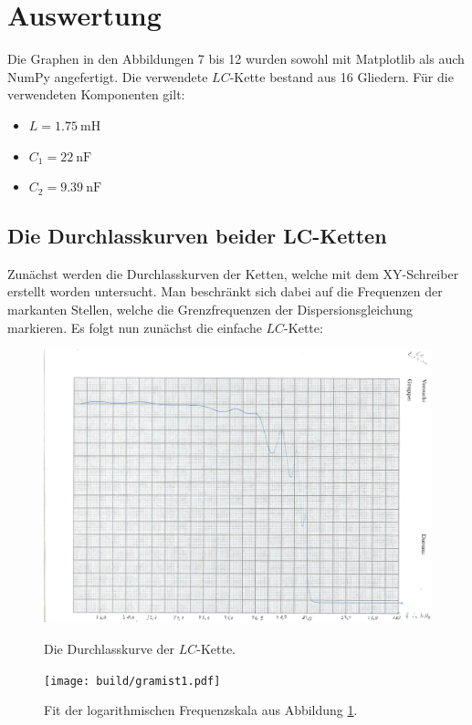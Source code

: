 
\section{Auswertung}
\label{sec:Auswertung}
Die Graphen in den Abbildungen 7 bis 12 wurden sowohl mit Matplotlib \cite{matplotlib} als auch NumPy \cite{numpy} angefertigt. Die verwendete $LC$-Kette bestand aus 16 Gliedern. Für die verwendeten Komponenten gilt:
\begin{itemize}
	\item $L=\SI{1.75}{\milli\henry}$
	\item $C_1=\SI{22}{\nano\farad}$
	\item $C_2=\SI{9.39}{\nano\farad}$
\end{itemize}
	

\subsection{Die Durchlasskurven beider LC-Ketten}
Zunächst werden die Durchlasskurven der Ketten, welche mit dem XY-Schreiber
 erstellt worden untersucht. Man beschränkt sich dabei auf die Frequenzen der
  markanten Stellen, welche die Grenzfrequenzen der Dispersionsgleichung
	 markieren. Es folgt nun zunächst die einfache $LC$-Kette:

   \begin{figure}
   	\centering
   	\caption{Die Durchlasskurve der $LC$-Kette.}
   	\includegraphics[width=\linewidth-70pt,height=\textheight-70pt,keepaspectratio]{content/Scans/LC.png}
   	\label{fig:Lc}
   \end{figure}
   \begin{figure}
   	\centering
   	\caption{Fit der logarithmischen Frequenzskala aus Abbildung \ref{fig:Lc}.}
   	\texttt{[image: build/gramist1.pdf]}
   	\label{fig:LcMist}
   \end{figure}


